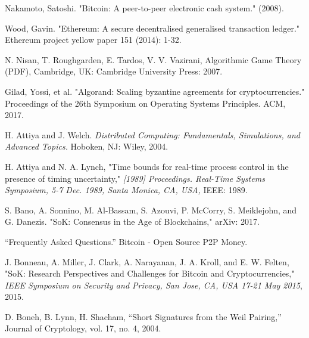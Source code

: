 \documentclass[10pt,journal,compsoc]{IEEEtran}
\begin{document}
%
%
%
\begin{thebibliography}{1}

 Nakamoto, Satoshi. "Bitcoin: A peer-to-peer electronic cash system." (2008).
 
 Wood, Gavin. "Ethereum: A secure decentralised generalised transaction ledger." Ethereum project yellow paper 151 (2014): 1-32.
 
 N. Nisan, T. Roughgarden, E. Tardos, V. V. Vazirani, Algorithmic Game Theory (PDF), Cambridge, UK: Cambridge University Press: 2007.

Gilad, Yossi, et al. "Algorand: Scaling byzantine agreements for cryptocurrencies." Proceedings of the 26th Symposium on Operating Systems Principles. ACM, 2017.

 H. Attiya and J. Welch. \emph{Distributed Computing: Fundamentals, Simulations, and Advanced Topics.} Hoboken, NJ: Wiley, 2004.

 H. Attiya and N. A. Lynch, "Time bounds for real-time process control in the presence of timing uncertainty," \emph{[1989] Proceedings. Real-Time Systems Symposium, 5-7 Dec. 1989,  Santa Monica, CA, USA,} IEEE: 1989.

 S. Bano, A. Sonnino, M. Al-Bassam, S. Azouvi, P. McCorry, S. Meiklejohn, and G. Danezis. "SoK: Consensus in the Age of Blockchains," arXiv: 2017.

 “Frequently Asked Questions.” Bitcoin - Open Source P2P Money.

 J. Bonneau, A. Miller, J. Clark, A. Narayanan, J. A. Kroll, and E. W. Felten, "SoK: Research Perspectives and Challenges for Bitcoin and Cryptocurrencies," \emph{IEEE Symposium on Security and Privacy, San Jose, CA, USA 17-21 May 2015}, 2015.

 D. Boneh, B. Lynn, H. Shacham, “Short Signatures from the Weil Pairing,” Journal of Cryptology, vol. 17, no. 4, 2004.


\end{thebibliography}
\end{document}

